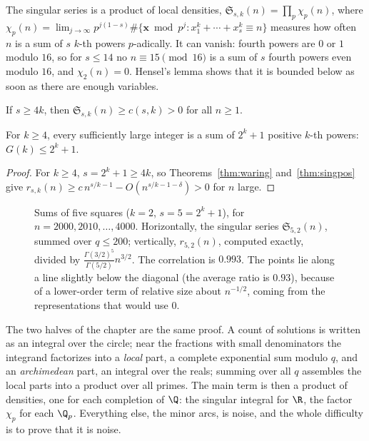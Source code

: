The singular series is a product of local densities, $\mathfrak S_{s,k}(n)=\prod_p\chi_p(n)$, where $\chi_p(n)=\lim_{j\to\infty}p^{j(1-s)}\#\{\mathbf x\bmod p^j:x_1^k+\cdots+x_s^k\equiv n\}$ measures how often $n$ is a sum of $s$ $k$-th powers $p$-adically. It can vanish: fourth powers are $0$ or $1$ modulo $16$, so for $s\le14$ no $n\equiv15\pmod{16}$ is a sum of $s$ fourth powers even modulo $16$, and $\chi_2(n)=0$. Hensel's lemma shows that it is bounded below as soon as there are enough variables.

\begin{theorem}\label{thm:singpos}
If $s\ge4k$, then $\mathfrak S_{s,k}(n)\ge c(s,k)>0$ for all $n\ge1$.
\end{theorem}

\begin{corollary}[Hua, 1938]\label{cor:gk}
For $k\ge4$, every sufficiently large integer is a sum of $2^k+1$ positive $k$-th powers: $G(k)\le2^k+1$.
\end{corollary}
\begin{proof}
For $k\ge4$, $s=2^k+1\ge4k$, so Theorems~\ref{thm:waring} and~\ref{thm:singpos} give $r_{s,k}(n)\ge c\,n^{s/k-1}-O(n^{s/k-1-\delta})>0$ for $n$ large.
\end{proof}

\begin{figure}[ht]
\centering
{}
\caption{Sums of five squares ($k=2$, $s=5=2^k+1$), for $n=2000,2010,\dots,4000$. Horizontally, the singular series $\mathfrak S_{5,2}(n)$, summed over $q\le200$; vertically, $r_{5,2}(n)$, computed exactly, divided by $\frac{\Gamma(3/2)^5}{\Gamma(5/2)}n^{3/2}$. The correlation is $0.993$. The points lie along a line slightly below the diagonal (the average ratio is $0.93$), because of a lower-order term of relative size about $n^{-1/2}$, coming from the representations that would use $0$.}
\label{fig:fivesquares}
\end{figure}

\begin{beauty}
The two halves of the chapter are the same proof. A count of solutions is written as an integral over the circle; near the fractions with small denominators the integrand factorizes into a \emph{local} part, a complete exponential sum modulo $q$, and an \emph{archimedean} part, an integral over the reals; summing over all $q$ assembles the local parts into a product over all primes. The main term is then a product of densities, one for each completion of $\Q$: the singular integral for $\R$, the factor $\chi_p$ for each $\Q_p$. Everything else, the minor arcs, is noise, and the whole difficulty is to prove that it is noise.
\end{beauty}

